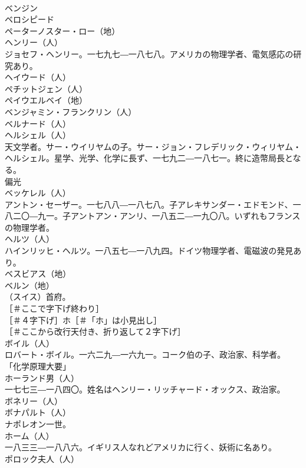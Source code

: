 \documentclass[8pt]{extreport}
\begin{document}
\begin{CJK}{UTF8}{min}
\\	ベンジン 
\\	ベロシピード 
\\	ペーターノスター・ロー（地）
\\	ヘンリー（人）
\\	ジョセフ・ヘンリー。一七九七―一八七八。アメリカの物理学者、電気感応の研究あり。
\\	ヘイウード（人）
\\	ペチットジェン（人）
\\	ペイウエルベイ（地）
\\	ベンジャミン・フランクリン（人）
\\	ベルナード（人）
\\	ヘルシェル（人）
\\	天文学者。サー・ウイリヤムの子。サー・ジョン・フレデリック・ウィリヤム・ヘルシェル。星学、光学、化学に長ず、一七九二―一八七一。終に造幣局長となる。
\\	偏光 
\\	ベッケレル（人）
\\	アントン・セーザー。一七八八―一八七八。子アレキサンダー・エドモンド、一八二〇―九一。子アントアン・アンリ、一八五二―一九〇八。いずれもフランスの物理学者。
\\	ヘルツ（人）
\\	ハインリッヒ・ヘルツ。一八五七―一八九四。ドイツ物理学者、電磁波の発見あり。
\\	ベスビアス（地）
\\	ベルン（地）
\\	（スイス）首府。
\\	［＃ここで字下げ終わり］
\\	［＃４字下げ］ホ［＃「ホ」は小見出し］
\\	［＃ここから改行天付き、折り返して２字下げ］
\\	ボイル（人）
\\	ロバート・ボイル。一六二九―一六九一。コーク伯の子、政治家、科学者。
\\	「化学原理大要」
\\	ホーランド男（人）
\\	一七七三―一八四〇。姓名はヘンリー・リッチャード・オックス、政治家。
\\	ボネリー（人）
\\	ボナパルト（人）
\\	ナポレオン一世。
\\	ホーム（人）
\\	一八三三―一八八六。イギリス人なれどアメリカに行く、妖術に名あり。
\\	ポロック夫人（人）

\end{CJK}
\end{document}
